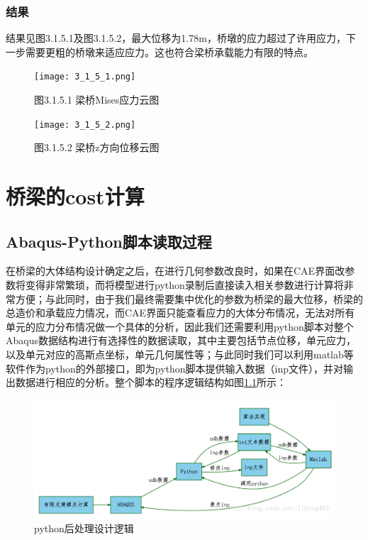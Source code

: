 \documentclass[forprint]{WHUBachelor}
\begin{document}
\subsection{结果}

结果见图3.1.5.1及图3.1.5.2，最大位移为1.78m，桥墩的应力超过了许用应力，下一步需要更粗的桥墩来适应应力。这也符合梁桥承载能力有限的特点。
\begin{figure}[H]
\centering
\texttt{[image: 3\_1\_5\_1.png]}
\caption{图3.1.5.1 梁桥Mises应力云图}
\end{figure}

\begin{figure}[H]
\centering
\texttt{[image: 3\_1\_5\_2.png]}
\caption{图3.1.5.2 梁桥z方向位移云图}
\end{figure}


\chapter{桥梁的cost计算}

\section{Abaqus-Python脚本读取过程}
在桥梁的大体结构设计确定之后，在进行几何参数改良时，如果在CAE界面改参数将变得非常繁琐，而将模型进行python录制后直接读入相关参数进行计算将非常方便；与此同时，由于我们最终需要集中优化的参数为桥梁的最大位移，桥梁的总造价和承载应力情况，而CAE界面只能查看应力的大体分布情况，无法对所有单元的应力分布情况做一个具体的分析，因此我们还需要利用python脚本对整个Abaqus数据结构进行有选择性的数据读取，其中主要包括节点位移，单元应力，以及单元对应的高斯点坐标，单元几何属性等；与此同时我们可以利用matlab等软件作为python的外部接口，即为python脚本提供输入数据（inp文件），并对输出数据进行相应的分析。整个脚本的程序逻辑结构如图\ref{4-1}所示：

\begin{figure}[H]
\centering  
\includegraphics[width = .8\textwidth]{1.png} 
\caption{python后处理设计逻辑} 
\label{4-1} 
\end{figure}
\end{document}
